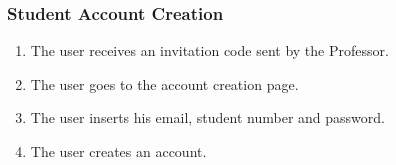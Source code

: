 \subsubsection{Student Account Creation}

\begin{enumerate}
    \item The user receives an invitation code sent by the Professor.
    \item The user goes to the account creation page.
    \item The user inserts his email, student number and password.
    \item The user creates an account.
\end{enumerate}